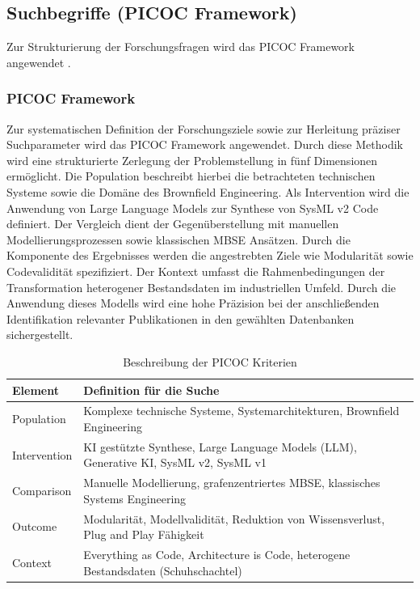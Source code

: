 \subsection{Suchbegriffe (PICOC Framework)}

Zur Strukturierung der Forschungsfragen wird das PICOC Framework angewendet \cite{Wohlin.2012}.
\subsubsection{PICOC Framework}

Zur systematischen Definition der Forschungsziele sowie zur Herleitung präziser Suchparameter wird das PICOC Framework angewendet. Durch diese Methodik wird eine strukturierte Zerlegung der Problemstellung in fünf Dimensionen ermöglicht. Die Population beschreibt hierbei die betrachteten technischen Systeme sowie die Domäne des Brownfield Engineering. Als Intervention wird die Anwendung von Large Language Models zur Synthese von SysML v2 Code definiert. Der Vergleich dient der Gegenüberstellung mit manuellen Modellierungsprozessen sowie klassischen MBSE Ansätzen. Durch die Komponente des Ergebnisses werden die angestrebten Ziele wie Modularität sowie Codevalidität spezifiziert. Der Kontext umfasst die Rahmenbedingungen der Transformation heterogener Bestandsdaten im industriellen Umfeld. Durch die Anwendung dieses Modells wird eine hohe Präzision bei der anschließenden Identifikation relevanter Publikationen in den gewählten Datenbanken sichergestellt.

\begin{table}[h]
\centering
\begin{tabular}{|l|p{10cm}|}
\hline
\textbf{Element} & \textbf{Definition für die Suche} \\ \hline
Population & Komplexe technische Systeme, Systemarchitekturen, Brownfield Engineering \\ \hline
Intervention & KI gestützte Synthese, Large Language Models (LLM), Generative KI, SysML v2, SysML v1 \\ \hline
Comparison & Manuelle Modellierung, grafenzentriertes MBSE, klassisches Systems Engineering \\ \hline
Outcome & Modularität, Modellvalidität, Reduktion von Wissensverlust, Plug and Play Fähigkeit \\ \hline
Context & Everything as Code, Architecture is Code, heterogene Bestandsdaten (Schuhschachtel) \\ \hline
\end{tabular}
\caption{Beschreibung der PICOC Kriterien} %
\label{tab:picoc_kriterien} %
\end{table}

